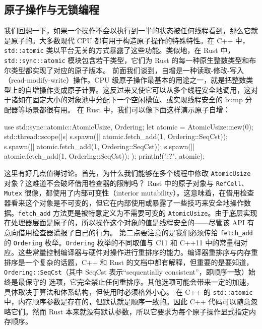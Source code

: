 \subsection{原子操作与无锁编程}
\label{idx:idx_1dbec30c}
\label{idx:idx_075c99c5}
我们回想一下，如果一个操作不会以执行到一半的状态被任何线程看到，那么它就是原子的。大多数现代 CPU 都有用于构造原子操作的特殊特性。在 C++ 中，
\texttt{std::atomic} 类以平台无关的方式暴露了这些功能。类似地，在 Rust 中，
\label{idx:idx_94da8b6a}
\texttt{std::\allowbreak{}sync::\allowbreak{}atomic} 模块包含若干类型，它们为 Rust 的每一种原生整数类型和布尔类型都实现了对应的原子版本。
\label{idx:idx_050b5300}
前面我们谈到，自增是一种读取-\allowbreak{}修改-\allowbreak{}写入（read-\allowbreak{}modify-\allowbreak{}write）操作。CPU 级原子操作最基本的用途之一，就是把整数类型上的自增操作变成原子计算。这反过来又使它可以从多个线程安全地调用，这对于诸如在固定大小的对象池中分配下一个空闲槽位、或实现线程安全的 bump 分配器等场景都很有用。
在 Rust 中，我们可以像下面这样演示原子自增：
\begin{codebox}[rust]
use std::sync::atomic::{AtomicUsize, Ordering};
let atomic = AtomicUsize::new(0);
std::thread::scope(|s| {
      s.spawn(|| atomic.fetch_add(1, Ordering::SeqCst));
      s.spawn(|| atomic.fetch_add(1, Ordering::SeqCst));
      s.spawn(|| atomic.fetch_add(1, Ordering::SeqCst));
});
println!("{:?}", atomic);
\end{codebox}
这里有好几点值得讨论。首先，为什么我们能够在多个线程中修改 \texttt{AtomicUsize} 对象？这难道不会破坏借用检查器的限制吗？
Rust 中的原子对象与 \texttt{RefCell}、\texttt{Mutex} 很像，都使用了内部可变性（interior mutability）。这意味着，在借用检查器看来这个对象是不可变的，但它在内部使用或暴露了一些技巧来安全地操作数据。\texttt{fetch\_add} 方法更是被特意定义为不需要可变的 \texttt{AtomicUsize}。由于底层实现在处理器层面是原子的，所以操作这个对象的值是线程安全的——尽管该 API 有意向借用检查器谎报了自己的行为。
\label{idx:idx_57aec965}
\label{idx:idx_d91377ff}
第二点要注意的是我们必须传给 \texttt{fetch\_add} 的 \texttt{Ordering} 枚举。\texttt{Ordering} 枚举的不同取值与 C11 和 C++11 中的常量相对应。这些常量控制编译器与硬件对操作进行重排序的能力。编译器重排序与内存重排序是一个复杂的话题，C++ 和 Rust 的文档中都有解释，但重要的是要知道，
\texttt{Ordering::\allowbreak{}SeqCst}（其中 SeqCst 表示“sequentially consistent”，即顺序一致）始终是最保守的
\label{idx:idx_2851b07b}
\label{idx:idx_e15da949}
选项，它完全禁止任何重排序。其他选项可能会带来一定的加速，具体取决于算法和体系结构，但使用时必须格外小心。
在 C++ 的 \texttt{std::atomic} 中，内存顺序参数是存在的，但默认就是顺序一致的。因此 C++ 代码可以随意忽略它们。然而 Rust 本来就没有默认参数，所以它要求为每个原子操作显式指定内存顺序。

